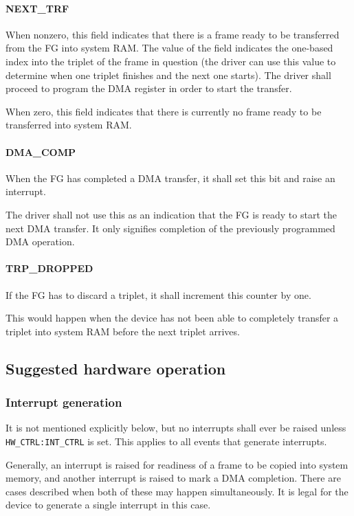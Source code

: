 \documentclass[12pt]{article}
\begin{document}
\paragraph{NEXT\_TRF}

When nonzero, this field indicates that there is a frame ready to be transferred from the FG into system RAM. The value of the field indicates the one-based index into the triplet of the frame in question (the driver can use this value to determine when one triplet finishes and the next one starts). The driver shall proceed to program the DMA register in order to start the transfer.

When zero, this field indicates that there is currently no frame ready to be transferred into system RAM.

\paragraph{DMA\_COMP}

When the FG has completed a DMA transfer, it shall set this bit and raise an interrupt.

The driver shall not use this as an indication that the FG is ready to start the next DMA transfer. It only signifies completion of the previously programmed DMA operation.

\paragraph{TRP\_DROPPED}

If the FG has to discard a triplet, it shall increment this counter by one.

This would happen when the device has not been able to completely transfer a triplet into system RAM before the next triplet arrives.

\subsection{Suggested hardware operation}

\subsubsection{Interrupt generation}

It is not mentioned explicitly below, but no interrupts shall ever be raised unless \texttt{HW\_CTRL:INT\_CTRL} is set. This applies to all events that generate interrupts.

Generally, an interrupt is raised for readiness of a frame to be copied into system memory, and another interrupt is raised to mark a DMA completion. There are cases described when both of these may happen simultaneously. It is legal for the device to generate a single interrupt in this case.
\end{document}
